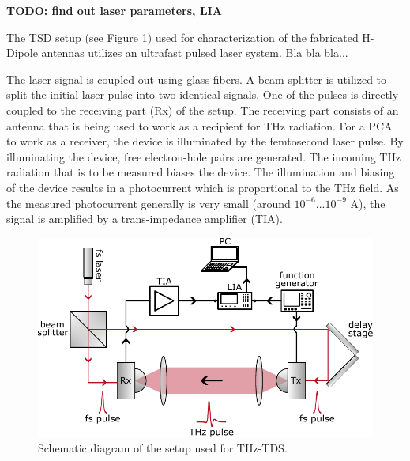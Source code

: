 \textbf{TODO: find out laser parameters, LIA} 

The TSD setup (see Figure \ref{fig_TDS}) used for characterization of the fabricated H-Dipole antennas utilizes an ultrafast pulsed laser system. Bla bla bla...

The laser signal is coupled out using glass fibers. A beam splitter is utilized to split the initial laser pulse into two identical signals. One of the pulses is directly coupled to the receiving part (Rx) of the setup. The receiving part consists of an antenna that is being used to work as a recipient for THz radiation. For a PCA to work as a receiver, the device is illuminated by the femtosecond laser pulse. By illuminating the device, free electron-hole pairs are generated. The incoming THz radiation that is to be measured biases the device. The illumination and biasing of the device results in a photocurrent which is proportional to the THz field. As the measured photocurrent generally is very small (around $10^{-6} ... 10^{-9}$ \si{\ampere}), the signal is amplified by a trans-impedance amplifier (TIA).      

\begin{figure}[ht]
    \includegraphics[width=0.9\linewidth]{figures/TDS_schematic.pdf}
    \centering
    \caption{Schematic diagram of the setup used for THz-TDS.}
    \label{fig_TDS}
\end{figure}

